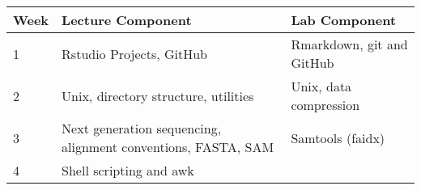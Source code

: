 \documentclass[]{book}
\begin{document}
\begin{longtable}[]{@{}lll@{}}
\toprule
\begin{minipage}[b]{0.13\columnwidth}\raggedright
Week\strut
\end{minipage} & \begin{minipage}[b]{0.46\columnwidth}\raggedright
Lecture Component\strut
\end{minipage} & \begin{minipage}[b]{0.33\columnwidth}\raggedright
Lab Component\strut
\end{minipage}\tabularnewline
\midrule
\endhead
\begin{minipage}[t]{0.13\columnwidth}\raggedright
1\strut
\end{minipage} & \begin{minipage}[t]{0.46\columnwidth}\raggedright
Rstudio Projects, GitHub\strut
\end{minipage} & \begin{minipage}[t]{0.33\columnwidth}\raggedright
Rmarkdown, git and GitHub\strut
\end{minipage}\tabularnewline
\begin{minipage}[t]{0.13\columnwidth}\raggedright
2\strut
\end{minipage} & \begin{minipage}[t]{0.46\columnwidth}\raggedright
Unix, directory structure, utilities\strut
\end{minipage} & \begin{minipage}[t]{0.33\columnwidth}\raggedright
Unix, data compression\strut
\end{minipage}\tabularnewline
\begin{minipage}[t]{0.13\columnwidth}\raggedright
3\strut
\end{minipage} & \begin{minipage}[t]{0.46\columnwidth}\raggedright
Next generation sequencing, alignment conventions, FASTA, SAM\strut
\end{minipage} & \begin{minipage}[t]{0.33\columnwidth}\raggedright
Samtools (faidx)\strut
\end{minipage}\tabularnewline
\begin{minipage}[t]{0.13\columnwidth}\raggedright
4\strut
\end{minipage} & \begin{minipage}[t]{0.46\columnwidth}\raggedright
Shell scripting and awk\strut
\end{minipage} & \begin{minipage}[t]{0.33\columnwidth}\raggedright

\end{minipage}
\end{longtable}
\end{document}
